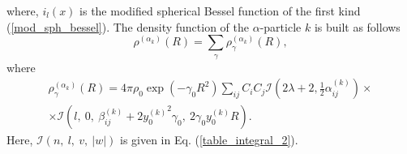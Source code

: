 \documentclass[
12pt, %
oneside, %
english, %
doublespacing, %
doublespacing, %
toctotoc, %
parskip, %
headsepline, %
]{MastersDoctoralThesis} %
\begin{document}
where, $i_l(x)$ is the modified spherical Bessel function of the first kind (\ref{mod_sph_bessel}).
The density function of the $\alpha$-particle $k$ is built as follows
\begin{equation}
\rho^{(\alpha_k)}(R)=\sum_\gamma \rho^{(\alpha_k)}_{\gamma}(R),
\label{rho_alphak}
\end{equation}
where
\begin{align}
\rho^{(\alpha_k)}_\gamma(R)= 
4 \pi \rho_0 \exp\left(-\gamma_0 R^2 \right)
\sum_{ij} C_i C_j 
 \mathcal{I}\left( 2\lambda+2, \tfrac{1}{2} \alpha^{(k)}_{ij}\right) \times \\
 \times \mathcal{I}\left( l,~0,~\beta_{ij}^{(k)}+2{y^{(k)}_0}^2 \gamma_0,~2\gamma_0 y^{(k)}_0 R \right). \nonumber
\end{align}
Here, $\mathcal{I}(n,~l,~v,~|w|)$ is given in Eq. (\ref{table_integral_2}). 
\end{document}
